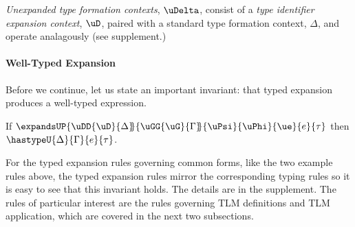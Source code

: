 \documentclass[acmsmall,10pt,review,anonymous]{acmart}\settopmatter{printfolios=true}
\begin{document}
\emph{Unexpanded type formation contexts}, $\uDelta$, consist of a \emph{type identifier expansion context}, $\uD$, paired with a standard type formation context, $\Delta$, and operate analagously (see supplement.)


\paragraph{Well-Typed Expansion} Before we continue, let us state an important invariant: that typed expansion produces a well-typed expression.
\begin{theorem}\label{thm:typed-expansion-short-U}
If $\expandsUP{\uDD{\uD}{\Delta}\hspace{-3px}}{\uGG{\uG}{\Gamma}\hspace{-3px}}{\uPsi}{\uPhi}{\ue}{e}{\tau}$ then $\hastypeU{\Delta}{\Gamma}{e}{\tau}$.
\end{theorem}
For the typed expansion rules governing common forms, like the two example rules above, the typed expansion rules mirror the corresponding typing rules so it is easy to see that this invariant holds. The details are in the supplement. The  rules of particular interest are the rules governing TLM definitions and TLM application, which are covered in the next two subsections. 

\end{document}
